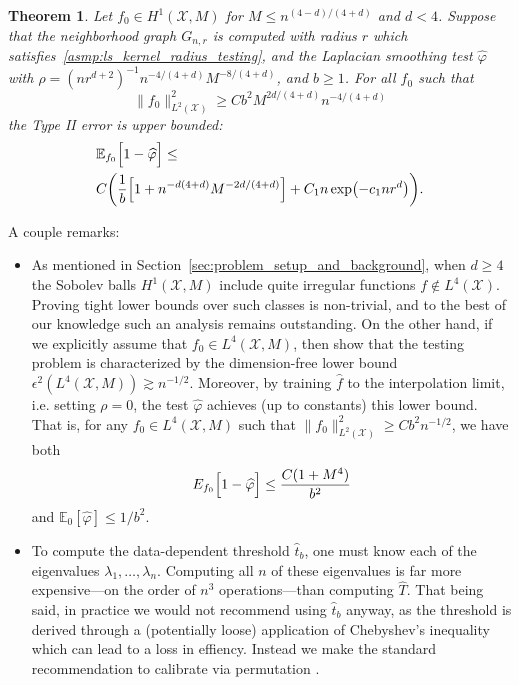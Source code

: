 \documentclass[twoside]{article}
\newcommand{\1}{\mathbf{1}}
\newcommand{\Xset}{\mathcal{X}}
\newcommand{\Leb}{L}
\newcommand{\Ebb}{\mathbb{E}}
\newcommand{\wh}[1]{\widehat{#1}}
\newtheorem{theorem}{Theorem}
\theoremstyle{definition}
\theoremstyle{remark}
\begin{document}
\begin{theorem}
	\label{thm:laplacian_smoothing_testing}
	Let $f_0 \in H^1(\Xset,M)$ for $M \leq n^{(4 - d)/(4 + d)}$ and $d < 4$. Suppose that the neighborhood graph $G_{n,r}$ is computed with radius $r$ which satisfies~\ref{asmp:ls_kernel_radius_testing}, and the Laplacian smoothing test $\wh{\varphi}$ with $\rho = (nr^{d + 2})^{-1} n^{-4/(4 + d)} M^{-8/(4 + d)}$, and $b \geq 1$. For all $f_0$ such that
	\begin{equation}
	\label{eqn:laplacian_smoothing_testing}
	\bigl\|f_0\bigr\|_{\Leb^2(\Xset)}^2 \geq C b^2 M^{2d/(4 + d)} n^{-4/(4 + d)}
	\end{equation} 
	the Type II error is upper bounded:
	\begin{align*}
	& \Ebb_{f_0}\Bigl[1 - \wh{\varphi} \Bigr] \leq \\
	& C\biggl(\frac{1}{b}\Bigl[1 + n^{-d(4 + d)}M^{-2d/(4 + d)}\Bigr] + C_1n\exp\bigl(-c_1nr^d\bigr)\biggr).
	\end{align*}
\end{theorem}
A couple remarks:
\begin{itemize}
	\item As mentioned in Section~\ref{sec:problem_setup_and_background}, when $d \geq 4$ the Sobolev balls $H^1(\Xset,M)$ include quite irregular functions $f \not\in \Leb^4(\Xset)$. Proving tight lower bounds over such classes is non-trivial, and to the best of our knowledge such an analysis remains outstanding. On the other hand, if we explicitly assume that $f_0 \in \Leb^4(\Xset,M)$, then \cite{guerre02} show that the testing problem is characterized by the dimension-free lower bound $\epsilon^{2}(\Leb^4(\Xset,M)) \gtrsim n^{-1/2}$. Moreover, by training $\wh{f}$ to the interpolation limit, i.e. setting $\rho = 0$, the test $\wh{\varphi}$ achieves (up to constants) this lower bound. That is, for any $f_0 \in \Leb^4(\Xset,M)$ such that $\|f_0\|_{\Leb^2(\Xset)}^2 \geq C b^2n^{-1/2}$, we have both
	\begin{equation}
	\label{eqn:laplacian_smoothing_testing_low_smoothness}
	E_{f_0}\Bigl[1 - \wh{\varphi}\Bigr] \leq \frac{C(1 + M^4)}{b^2}
	\end{equation} 
	and $\Ebb_0[\wh{\varphi}] \leq 1/b^2$.
	\item To compute the data-dependent threshold $\wh{t}_b$, one must know each of the eigenvalues $\lambda_1,\ldots,\lambda_n$. Computing all $n$ of these eigenvalues is far more expensive---on the order of $n^3$ operations---than computing $\wh{T}$. That being said, in practice we would not recommend using $\wh{t}_b$ anyway, as the threshold is derived through a (potentially loose) application of Chebyshev's inequality which can lead to a loss in effiency. Instead we make the standard recommendation to calibrate via permutation \citep{hoeffding1952}. 
\end{itemize}
\end{document}
